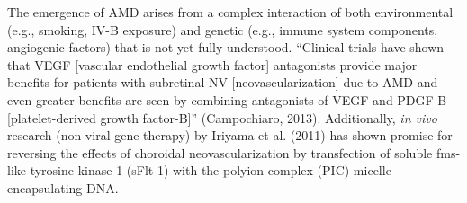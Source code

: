 The emergence of AMD arises from a complex interaction of both environmental (e.g., smoking, IV-B exposure) and genetic (e.g., immune system components, angiogenic factors) that is not yet fully understood. ``Clinical trials have shown that VEGF [vascular endothelial growth factor] antagonists provide major benefits for patients with subretinal NV [neovascularization] due to AMD and even greater benefits are seen by combining antagonists of VEGF and PDGF-B [platelet-derived growth factor-B]'' (Campochiaro, 2013). Additionally, \textit{in vivo} research (non-viral gene therapy) by Iriyama et al. (2011) has shown promise for reversing the effects of choroidal neovascularization by transfection of soluble fms-like tyrosine kinase-1 (sFlt-1) with the polyion complex (PIC) micelle encapsulating DNA.